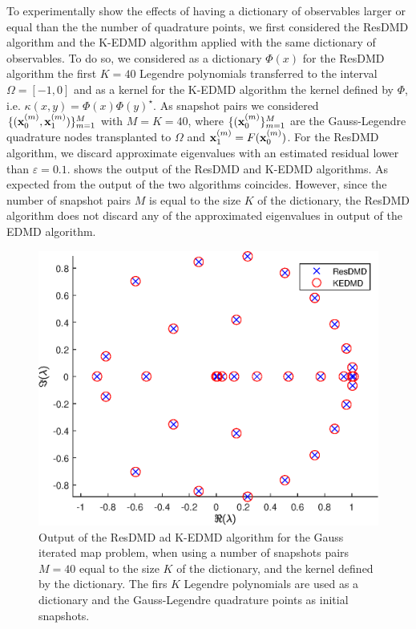 To experimentally show the effects of having a dictionary of observables larger or equal than the the number of quadrature points, we first considered the ResDMD algorithm and the K-EDMD algorithm applied with the same dictionary of observables. To do so, we considered as a dictionary $\Phi(x)$ for the ResDMD algorithm the first $K=40$ Legendre polynomials transferred to the interval $\Omega = [-1,0]$ and as a kernel for the K-EDMD algorithm the kernel defined by $\Phi$, i.e. $\kappa(x,y) = \Phi(x)\Phi(y)^\star$. As snapshot pairs we considered $\{(\vb{x}_0^{(m)}, \vb{x}_1^{(m)})\}_{m = 1}^M$ with $M=K=40$, where $\{(\vb{x}_0^{(m)}\}_{m = 1}^M$ are the Gauss-Legendre quadrature nodes transplanted to $\Omega$ and $\vb{x}_1^{(m)} = F(\vb{x}_0^{(m)})$. For the ResDMD algorithm, we discard approximate eigenvalues with an estimated residual lower than $\varepsilon = 0.1$.  shows the output of the ResDMD and K-EDMD algorithms. As expected from  the output of the two algorithms coincides. However, since the number of snapshot pairs $M$ is equal to the size $K$ of the dictionary, the ResDMD algorithm does not discard any of the approximated eigenvalues in output of the EDMD algorithm.  
\begin{figure}[h]
\centering
\includegraphics[width=0.55\linewidth]{../code/figures/gauss_map/kernelized/KEDMD_Gauss-Legendre.eps}
\caption{Output of the ResDMD ad K-EDMD algorithm for the Gauss iterated map problem, when using a number of snapshots pairs $M = 40$ equal to the size $K$ of the dictionary, and the kernel defined by the dictionary. The firs $K$ Legendre polynomials are used as a dictionary and the Gauss-Legendre quadrature points as initial snapshots.}
\label{fig_kedmd_vs_edmd}
\end{figure}

